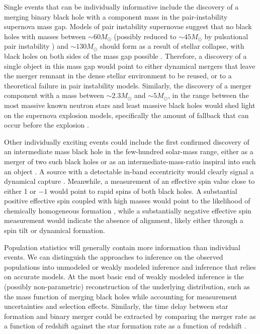 \documentclass[iop,onecolumn]{revtex4}
\begin{document}
Single events that can be individually informative include the discovery of a merging binary black hole with a component mass in the pair-instability supernova mass gap.  Models of pair instability supernovae suggest that no black holes with masses between $\sim 60 M_\odot$ (possibly reduced to $\sim 45 M_\odot$ by pulsational pair instability \citep{Woosley:2017}) and $\sim 130 M_\odot$ should form as a result of stellar collapse, with black holes on both sides of the mass gap possible \citep{Marchant:2016}.  Therefore, a discovery of a single object in this mass gap would point to either dynamical mergers that leave the merger remnant in the dense stellar environment to be reused, or to a theoretical failure in pair instability models.  Similarly, the discovery of a merger component with a mass between $\sim 2.3 M_\odot$ and $\sim 5 M_\odot$, in the range between the most massive known neutron stars and least massive black holes \citep{Ozel:2010,Farr:2011} would shed light on the supernova explosion models, specifically the amount of fallback that can occur before the explosion \citep{Fryer:2012}.

Other individually exciting events could include the first confirmed discovery of an intermediate mass black hole in the few-hundred solar-mass range, either as a merger of two such black holes \citep[e.g.,][]{Veitch:2015,Graff:2015} or as an intermediate-mass-ratio inspiral into such an object \citep[e.g.,][]{Haster:2015IMRI,Haster:2016}.  A source with a detectable in-band eccentricity would clearly signal a dynamical capture \citep{Breivik:2016}.  Meanwhile, a measurement of an effective spin value close to either 1 or $-1$ would point to rapid spins of both black holes.  A substantial positive effective spin coupled with high masses would point to the likelihood of chemically homogeneous formation \citep{Marchant:2016}, while a substantially negative effective spin measurement would indicate the absence of alignment, likely either through a spin tilt or dynamical formation.  

Population statistics will generally contain more information than individual events.  We can distinguish the approaches to inference on the observed populations into unmodeled or weakly modeled inference and inference that relies on accurate models. At the most basic end of weakly modeled inference is the (possibly non-parametric) reconstruction of the underlying distribution, such as the mass function of merging black holes \citep{Mandel:2010stat,BBH:O1} while accounting for measurement uncertainties and selection effects.  Similarly, the time delay between star formation and binary merger could be extracted by comparing the merger rate as a function of redshift against the star formation rate as a function of redshift \citep{Mandel:2016select}.
\end{document}
